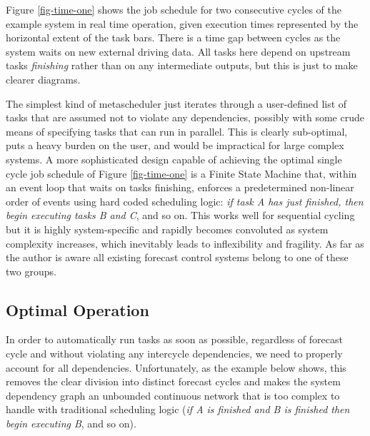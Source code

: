 \documentclass[11pt,a4paper]{article}
\begin{document}
Figure \ref{fig-time-one} shows the job schedule for two consecutive
cycles of the example system in real time operation, given execution
times represented by the horizontal extent of the task bars. There is a
time gap between cycles as the system waits on new external driving
data. 
All tasks here depend on upstream tasks {\em finishing} rather than on
any intermediate outputs, but this is just to make clearer diagrams.

The simplest kind of metascheduler just iterates through a user-defined
list of tasks that are assumed not to violate any dependencies, possibly
with some crude means of specifying tasks that can run in parallel. This
is clearly sub-optimal, puts a heavy burden on the user, and would be
impractical for large complex systems. A more sophisticated design
capable of achieving the optimal single cycle job schedule of Figure
\ref{fig-time-one} is a Finite State Machine that, within an event loop
that waits on tasks finishing, enforces a predetermined non-linear order
of events using hard coded scheduling logic: {\em if task A has just
finished, then begin executing tasks B and C}, and so on.  This works
well for sequential cycling but it is highly system-specific and rapidly
becomes convoluted as system complexity increases, which inevitably
leads to inflexibility and fragility. As far as the author is aware all
existing forecast control systems belong to one of these two groups.

\subsection{Optimal Operation}

In order to automatically run tasks as soon as possible, regardless of
forecast cycle and without violating any intercycle dependencies,  we
need to properly account for all dependencies. Unfortunately, as the
example below shows, this removes the clear division into distinct
forecast cycles and makes the system dependency graph an unbounded
continuous network that is too complex to handle with traditional
scheduling logic ({\em if A is finished and B is finished then begin
executing B}, and so on).  

\end{document}
